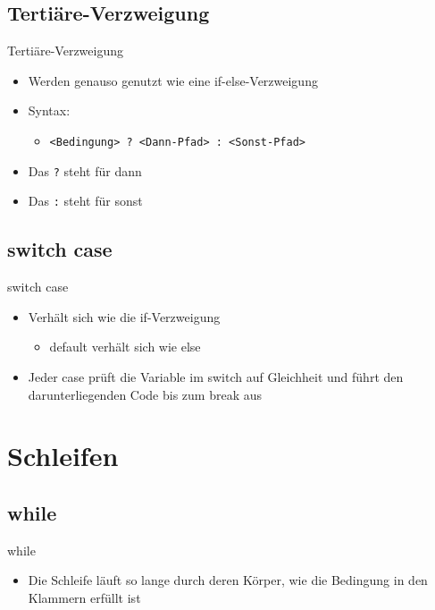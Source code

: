 \subsection{Tertiäre-Verzweigung}
\begin{frame}{Tertiäre-Verzweigung}
	\begin{itemize}
		\item Werden genauso genutzt wie eine if-else-Verzweigung
		\item Syntax:
		\begin{itemize}
			\item \texttt{\alert{<Bedingung>} ? \alert{<Dann-Pfad>} : \alert{<Sonst-Pfad>}}
		\end{itemize}
		\item Das \alert{\texttt{?}} steht für \alert{dann}
		\item Das \alert{\texttt{:}} steht für \alert{sonst}
	\end{itemize}		
	
\end{frame}

\subsection{switch case}
\begin{frame}{switch case}
	\begin{itemize}
		\item Verhält sich wie die if-Verzweigung
		\begin{itemize}
			\item \alert{default} verhält sich wie \alert{else}
		\end{itemize}
		\item Jeder \alert{case} prüft die Variable im \alert{switch} auf Gleichheit und führt den darunterliegenden Code bis zum \alert{break} aus
	\end{itemize}
	
\end{frame}

\section{Schleifen}
\subsection{while}
\begin{frame}{while}
	\begin{itemize}
		\item Die Schleife läuft so lange durch deren Körper, wie die Bedingung in den Klammern erfüllt ist
	\end{itemize}
		
\end{frame}

